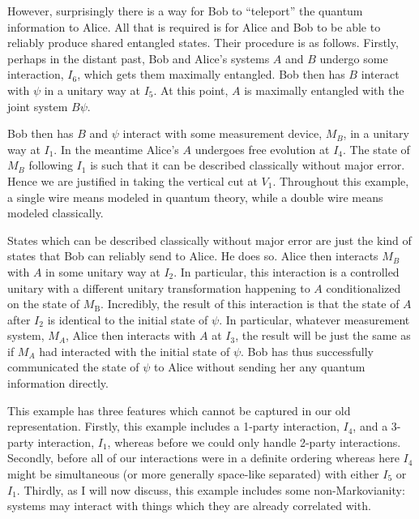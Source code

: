 \documentclass[prd,twocolumn,superscriptaddress,floatfix,amsmath,amssymb,amsfonts,nofootinbib]{revtex4-2}
\begin{document}
However, surprisingly there is a way for Bob to ``teleport'' the quantum information to Alice. All that is required is for Alice and Bob to be able to reliably produce shared entangled states. Their procedure is as follows. Firstly, perhaps in the distant past, Bob and Alice's systems $A$ and $B$ undergo some interaction, $I_6$, which gets them maximally entangled. Bob then has $B$ interact with $\psi$ in a unitary way at $I_5$. At this point, $A$ is maximally entangled with the joint system $B\psi$.

Bob then has $B$ and $\psi$ interact with some measurement device, $M_B$, in a unitary way at $I_1$. In the meantime Alice's $A$ undergoes free evolution at $I_4$. The state of $M_B$ following $I_1$ is such that it can be described classically without major error. Hence we are justified in taking the vertical cut at $V_1$. Throughout this example, a single wire means modeled in quantum theory, while a double wire means modeled classically.

States which can be described classically without major error are just the kind of states that Bob can reliably send to Alice. He does so. Alice then interacts $M_B$ with $A$ in some unitary way at $I_2$. In particular, this interaction is a controlled unitary with a different unitary transformation happening to $A$ conditionalized on the state of $M_\text{B}$. Incredibly, the result of this interaction is that the state of $A$ after $I_2$ is identical to the initial state of $\psi$. In particular, whatever measurement system, $M_A$, Alice then interacts with $A$ at $I_3$, the result will be just the same as if $M_A$ had interacted with the initial state of $\psi$. Bob has thus successfully communicated the state of $\psi$ to Alice without sending her any quantum information directly. %

This example has three features which cannot be captured in our old representation. Firstly, this example includes a 1-party interaction, $I_4$, and a 3-party interaction, $I_1$, whereas before we could only handle 2-party interactions. Secondly, before all of our interactions were in a definite ordering whereas here $I_4$ might be simultaneous (or more generally space-like separated) with either $I_5$ or $I_1$. Thirdly, as I will now discuss, this example includes some non-Markovianity: systems may interact with things which they are already correlated with.
\end{document}
